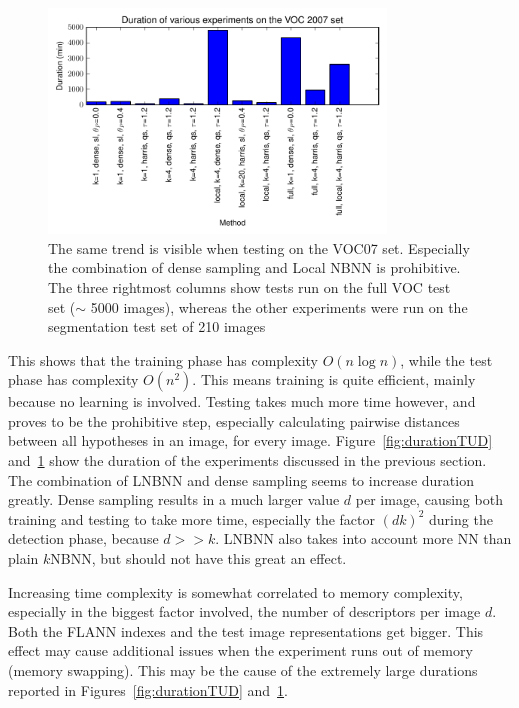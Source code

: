 \begin{figure}[hbt]
    \centering
    \includegraphics[width=0.8\textwidth]{DurVOC}
    \caption{The same trend is visible when testing on the VOC07 set. Especially the combination of dense sampling and Local NBNN is prohibitive. The three rightmost columns show tests run on the full VOC test set ($\sim$ 5000 images), whereas the other experiments were run on the segmentation test set of 210 images}
    \label{fig:durationVOC}
\end{figure}

This shows that the training phase has complexity $O(n\log n)$, while the test phase has complexity $O(n^2)$. This means training is quite efficient, mainly because no learning is involved. Testing takes much more time however, and proves to be the prohibitive step, especially calculating pairwise distances between all hypotheses in an image, for every image. Figure~\ref{fig:durationTUD} and~\ref{fig:durationVOC} show the duration of the experiments discussed in the previous section. The combination of LNBNN and dense sampling seems to increase duration greatly. Dense sampling results in a much larger value $d$ per image, causing both training and testing to take more time, especially the factor $(dk)^2$ during the detection phase, because $d>>k$. LNBNN also takes into account more NN than plain $k$NBNN, but should not have this great an effect.

Increasing time complexity is somewhat correlated to memory complexity, especially in the biggest factor involved, the number of descriptors per image $d$. Both the FLANN indexes and the test image representations get bigger. This effect may cause additional issues when the experiment runs out of memory (memory swapping). This may be the cause of the extremely large durations reported in Figures~\ref{fig:durationTUD} and~\ref{fig:durationVOC}.



